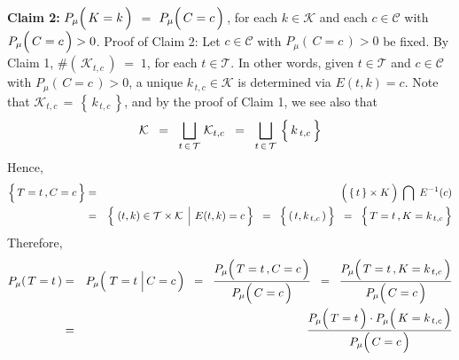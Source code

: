 \vskip 0.5cm
\noindent
\textbf{Claim 2:}\quad
$P_{\mu}\!\left(\,K \overset{{\color{white}1}}{=} k\,\right)$ $=$
$P_{\mu}\!\left(\, C \overset{{\color{white}1}}{=} c \,\right)$\,,\;
for each $k \in \mathcal{K}$ and each $c \in \mathcal{C}$ with $P_{\mu}\!\left(\, C \overset{{\color{white}1}}{=} c \,\right) > 0$.
\vskip 0.2cm
\noindent
Proof of Claim 2:\quad
Let $c \in \mathcal{C}$ with $P_{\mu}\!\left(\,C=c\,\right) > 0$ be fixed.
By Claim 1, $\#\!\left(\,\mathcal{K}_{t,c}\,\right) \; = \; 1$, for each $t \in \mathcal{T}$.
In other words, given $t \in \mathcal{T}$ and $c \in \mathcal{C}$ with $P_{\mu}\!\left(\,C = c\,\right) > 0$,
a unique $k_{\,t,c} \in \mathcal{K}$ is determined via $E(t,k) = c$.
Note that $\mathcal{K}_{t,c} \,=\, \left\{\,k_{\,t,c}\,\right\}$, and by the proof of Claim 1,
we see also that
\begin{equation*}
\mathcal{K}
\;\; = \;\;
	\underset{t\,\in\,\mathcal{T}}{\bigsqcup}\; \mathcal{K}_{t,c}
\;\; = \;\;
	\underset{t\,\in\,\mathcal{T}}{\bigsqcup}\, \left\{\, \overset{{\color{white}.}}{k}_{\,t,c}\, \right\}
\end{equation*}
Hence,
\begin{eqnarray*}
\left\{\,\overset{{\color{white}.}}{T}=t \,, C=c\,\right\}
& = &
	\left(\,\{\,t\,\} \overset{{\color{white}.}}{\times} K\,\right) \; \bigcap \; E^{-1}(c)
\\
& = &
	\left\{\,\left. (t,k) \overset{{\color{white}.}}{\in} \mathcal{T}\times\mathcal{K} \;\,\right\vert\, E(t,k) = c\,\right\}
\;\; = \;\;
	\left\{\,(\,\overset{{\color{white}.}}{t},k_{\,t,c}\,)\,\right\}
\;\; = \;\;
	\left\{\,\overset{{\color{white}.}}{T}=t \,, K=k_{\,t,c}\,\right\}
\end{eqnarray*}
Therefore,
\begin{eqnarray*}
P_{\mu}\!\left(\,T = t\,\right)
& = &
	P_{\mu}\!\left(\,\left. T \overset{{\color{white}1}}{=} t \;\right\vert C = c\,\right)
	\;\; = \;\;
	\dfrac{
		P_{\mu}\!\left(\, T \overset{{\color{white}1}}{=} t \,, C = c\,\right)
		}{
		P_{\mu}\!\left(\, C \overset{{\color{white}1}}{=} c \,\right)
		}
	\;\; = \;\;
	\dfrac{
		P_{\mu}\!\left(\, T \overset{{\color{white}1}}{=} t \,, K = k_{\,t,c}\,\right)
		}{
		P_{\mu}\!\left(\, C \overset{{\color{white}1}}{=} c \,\right)
		}
\\
& = &
	\dfrac{
		P_{\mu}\!\left(\, T \overset{{\color{white}1}}{=} t \,\right)
		\cdot
		P_{\mu}\!\left(\, K \overset{{\color{white}1}}{=} k_{\,t,c}\,\right)
		}{
		P_{\mu}\!\left(\, C \overset{{\color{white}1}}{=} c \,\right)
		}
\end{eqnarray*}
